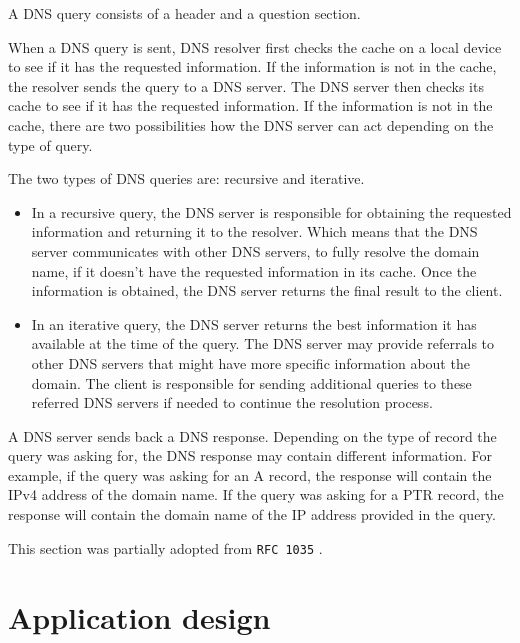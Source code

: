 \documentclass[a4paper, 11pt]{article}
\begin{document}
        A DNS query consists of a header and a question section.

        When a DNS query is sent, DNS resolver first checks the cache on a local device to see if it has the requested information.
        If the information is not in the cache, the resolver sends the query to a DNS server.
        The DNS server then checks its cache to see if it has the requested information.
        If the information is not in the cache, there are two possibilities how the DNS server can act depending on the type of query.

        The two types of DNS queries are: recursive and iterative.
        \begin{itemize}
            \item In a recursive query, the DNS server is responsible for obtaining the requested information and returning it to the resolver. 
                Which means that the DNS server communicates with other DNS servers, 
                to fully resolve the domain name, if it doesn't have the requested information in its cache.
                Once the information is obtained, the DNS server returns the final result to the client.
        
            \item In an iterative query, the DNS server returns the best information it has available at the time of the query. 
                The DNS server may provide referrals to other DNS servers that might have more specific information about the domain. 
                The client is responsible for sending additional queries to these referred DNS servers if needed to continue the resolution process. 
        \end{itemize} 

        A DNS server sends back a DNS response.
        Depending on the type of record the query was asking for, the DNS response may contain different information.
        For example, if the query was asking for an A record, the response will contain the IPv4 address of the domain name.
        If the query was asking for a PTR record, the response will contain the domain name of the IP address provided in the query.

        This section was partially adopted from \texttt{RFC 1035} \cite{1987}.

\section{Application design}
\end{document}
